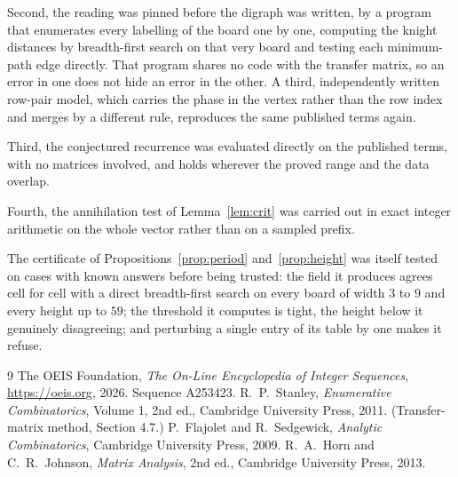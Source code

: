 \documentclass[11pt,a4paper]{article}
\theoremstyle{plain}
\theoremstyle{definition}
\begin{document}
Second, the reading was pinned before the digraph was written, by a program that enumerates
every labelling of the board one by one, computing the knight distances by breadth-first
search on that very board and testing each minimum-path edge directly. That program shares no
code with the transfer matrix, so an error in one does not hide an error in the other. A
third, independently written row-pair model, which carries the phase in the vertex rather than
the row index and merges by a different rule, reproduces the same published terms again.

Third, the conjectured recurrence was evaluated directly on the published terms, with no
matrices involved, and holds wherever the proved range and the data overlap.

Fourth, the annihilation test of Lemma~\ref{lem:crit} was carried out in exact integer
arithmetic on the whole vector rather than on a sampled prefix.

The certificate of Propositions~\ref{prop:period} and~\ref{prop:height} was itself tested
on cases with known answers before being trusted: the field it produces agrees cell for cell
with a direct breadth-first search on every board of width $3$ to $9$ and every height up to
$59$; the threshold it computes is tight, the height below it genuinely disagreeing; and
perturbing a single entry of its table by one makes it refuse.

\begin{thebibliography}{9}
 The OEIS Foundation, \emph{The On-Line Encyclopedia of Integer
Sequences}, \url{https://oeis.org}, 2026. Sequence A253423.
 R.~P.~Stanley, \emph{Enumerative Combinatorics}, Volume 1, 2nd ed.,
Cambridge University Press, 2011. (Transfer-matrix method, Section 4.7.)
 P.~Flajolet and R.~Sedgewick, \emph{Analytic Combinatorics}, Cambridge
University Press, 2009.
 R.~A.~Horn and C.~R.~Johnson, \emph{Matrix Analysis}, 2nd ed., Cambridge
University Press, 2013.
\end{thebibliography}
\end{document}
